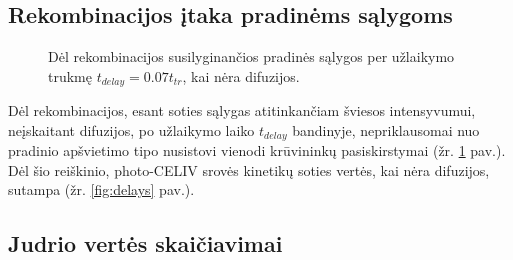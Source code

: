 \subsection{Rekombinacijos įtaka pradinėms sąlygoms}
\begin{figure}[H]
  \centering
  \caption{Dėl rekombinacijos susilyginančios pradinės sąlygos per užlaikymo trukmę $t_{delay} = 0.07t_{tr}$, kai nėra difuzijos.}
  \label{fig:recomb}
\end{figure}

Dėl rekombinacijos, esant soties sąlygas atitinkančiam šviesos intensyvumui, neįskaitant difuzijos, po užlaikymo laiko $t_{delay}$ bandinyje, nepriklausomai nuo pradinio apšvietimo tipo nusistovi vienodi krūvininkų pasiskirstymai (žr. \ref{fig:recomb} pav.).
Dėl šio reiškinio, photo-CELIV srovės kinetikų soties vertės, kai nėra difuzijos, sutampa (žr. \ref{fig:delays} pav.).

\subsection{Judrio vertės skaičiavimai}

